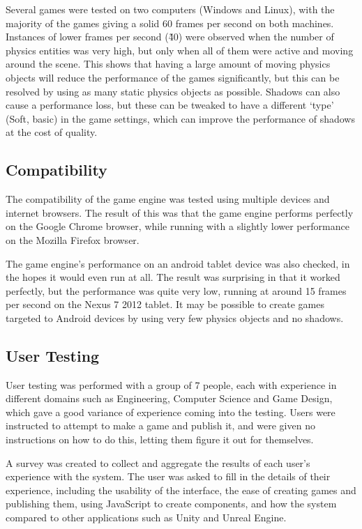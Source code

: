 	Several games were tested on two computers (Windows and Linux), with the majority of the games giving a solid 60 frames per second on both machines. Instances of lower frames per second (\~40) were observed when the number of physics entities was very high, but only when all of them were active and moving around the scene. This shows that having a large amount of moving physics objects will reduce the performance of the games significantly, but this can be resolved by using as many static physics objects as possible. Shadows can also cause a performance loss, but these can be tweaked to have a different `type' (Soft, basic) in the game settings, which can improve the performance of shadows at the cost of quality.

	\subsection{Compatibility}
	The compatibility of the game engine was tested using multiple devices and internet browsers. The result of this was that the game engine performs perfectly on the Google Chrome browser, while running with a slightly lower performance on the Mozilla Firefox browser.

	The game engine's performance on an android tablet device was also checked, in the hopes it would even run at all. The result was surprising in that it worked perfectly, but the performance was quite very low, running at around 15 frames per second on the Nexus 7 2012 tablet. It may be possible to create games targeted to Android devices by using very few physics objects and no shadows.

	\subsection{User Testing}
	\label{section:usertesting}
	User testing was performed with a group of 7 people, each with experience in different domains such as Engineering, Computer Science and Game Design, which gave a good variance of experience coming into the testing. Users were instructed to attempt to make a game and publish it, and were given no instructions on how to do this, letting them figure it out for themselves.

	A survey was created to collect and aggregate the results of each user's experience with the system. The user was asked to fill in the details of their experience, including the usability of the interface, the ease of creating games and publishing them, using JavaScript to create components, and how the system compared to other applications such as Unity and Unreal Engine.

